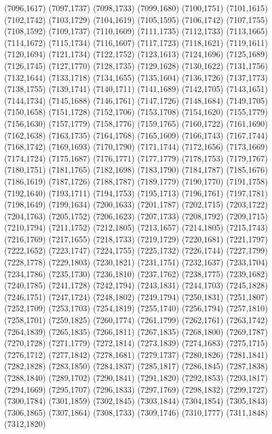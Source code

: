 (7096,1617)
(7097,1737)
(7098,1733)
(7099,1680)
(7100,1751)
(7101,1615)
(7102,1742)
(7103,1729)
(7104,1619)
(7105,1595)
(7106,1742)
(7107,1755)
(7108,1592)
(7109,1737)
(7110,1609)
(7111,1735)
(7112,1733)
(7113,1665)
(7114,1672)
(7115,1734)
(7116,1607)
(7117,1723)
(7118,1621)
(7119,1611)
(7120,1694)
(7121,1734)
(7122,1752)
(7123,1613)
(7124,1696)
(7125,1689)
(7126,1745)
(7127,1770)
(7128,1735)
(7129,1628)
(7130,1622)
(7131,1756)
(7132,1644)
(7133,1718)
(7134,1655)
(7135,1604)
(7136,1726)
(7137,1773)
(7138,1755)
(7139,1741)
(7140,1711)
(7141,1689)
(7142,1705)
(7143,1651)
(7144,1734)
(7145,1688)
(7146,1761)
(7147,1726)
(7148,1684)
(7149,1705)
(7150,1658)
(7151,1728)
(7152,1706)
(7153,1708)
(7154,1620)
(7155,1779)
(7156,1630)
(7157,1779)
(7158,1776)
(7159,1765)
(7160,1722)
(7161,1690)
(7162,1638)
(7163,1735)
(7164,1768)
(7165,1609)
(7166,1743)
(7167,1744)
(7168,1742)
(7169,1693)
(7170,1790)
(7171,1744)
(7172,1656)
(7173,1669)
(7174,1724)
(7175,1687)
(7176,1771)
(7177,1779)
(7178,1753)
(7179,1767)
(7180,1751)
(7181,1765)
(7182,1698)
(7183,1790)
(7184,1787)
(7185,1676)
(7186,1619)
(7187,1726)
(7188,1787)
(7189,1779)
(7190,1770)
(7191,1758)
(7192,1640)
(7193,1711)
(7194,1753)
(7195,1713)
(7196,1761)
(7197,1781)
(7198,1649)
(7199,1634)
(7200,1633)
(7201,1787)
(7202,1715)
(7203,1722)
(7204,1763)
(7205,1752)
(7206,1623)
(7207,1733)
(7208,1792)
(7209,1715)
(7210,1794)
(7211,1752)
(7212,1805)
(7213,1657)
(7214,1805)
(7215,1743)
(7216,1769)
(7217,1655)
(7218,1733)
(7219,1729)
(7220,1681)
(7221,1797)
(7222,1652)
(7223,1747)
(7224,1755)
(7225,1732)
(7226,1744)
(7227,1799)
(7228,1778)
(7229,1803)
(7230,1821)
(7231,1751)
(7232,1637)
(7233,1704)
(7234,1786)
(7235,1730)
(7236,1810)
(7237,1762)
(7238,1775)
(7239,1682)
(7240,1785)
(7241,1728)
(7242,1794)
(7243,1831)
(7244,1703)
(7245,1828)
(7246,1751)
(7247,1724)
(7248,1802)
(7249,1794)
(7250,1831)
(7251,1807)
(7252,1709)
(7253,1703)
(7254,1819)
(7255,1740)
(7256,1794)
(7257,1810)
(7258,1701)
(7259,1825)
(7260,1774)
(7261,1799)
(7262,1761)
(7263,1742)
(7264,1839)
(7265,1835)
(7266,1811)
(7267,1835)
(7268,1800)
(7269,1787)
(7270,1728)
(7271,1779)
(7272,1814)
(7273,1839)
(7274,1683)
(7275,1715)
(7276,1712)
(7277,1842)
(7278,1681)
(7279,1737)
(7280,1826)
(7281,1841)
(7282,1828)
(7283,1850)
(7284,1837)
(7285,1817)
(7286,1845)
(7287,1838)
(7288,1840)
(7289,1702)
(7290,1841)
(7291,1820)
(7292,1853)
(7293,1817)
(7294,1669)
(7295,1707)
(7296,1833)
(7297,1769)
(7298,1832)
(7299,1727)
(7300,1784)
(7301,1859)
(7302,1845)
(7303,1844)
(7304,1854)
(7305,1843)
(7306,1865)
(7307,1864)
(7308,1733)
(7309,1746)
(7310,1777)
(7311,1848)
(7312,1820)
